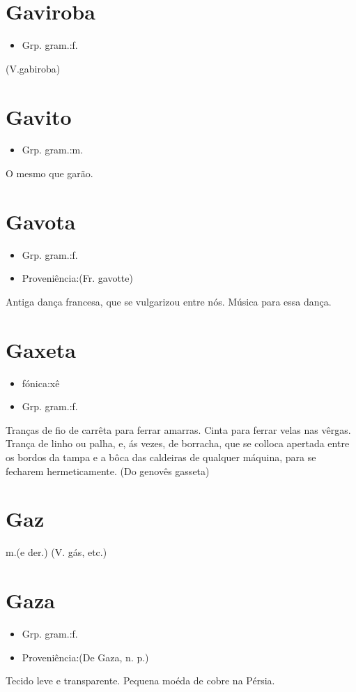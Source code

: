 \section{Gaviroba}
\begin{itemize}
\item {Grp. gram.:f.}
\end{itemize}
(V.gabiroba)
\section{Gavito}
\begin{itemize}
\item {Grp. gram.:m.}
\end{itemize}
O mesmo que \textunderscore garão\textunderscore .
\section{Gavota}
\begin{itemize}
\item {Grp. gram.:f.}
\end{itemize}
\begin{itemize}
\item {Proveniência:(Fr. \textunderscore gavotte\textunderscore )}
\end{itemize}
Antiga dança francesa, que se vulgarizou entre nós.
Música para essa dança.
\section{Gaxeta}
\begin{itemize}
\item {fónica:xê}
\end{itemize}
\begin{itemize}
\item {Grp. gram.:f.}
\end{itemize}
Tranças de fio de carrêta para ferrar amarras.
Cinta para ferrar velas nas vêrgas.
Trança de linho ou palha, e, ás vezes, de borracha, que se colloca apertada entre os bordos da tampa e a bôca das caldeiras de qualquer máquina, para se fecharem hermeticamente.
(Do genovês \textunderscore gasseta\textunderscore )
\section{Gaz}
\textunderscore m.\textunderscore  (e der.)
(V. \textunderscore gás\textunderscore , etc.)
\section{Gaza}
\begin{itemize}
\item {Grp. gram.:f.}
\end{itemize}
\begin{itemize}
\item {Proveniência:(De \textunderscore Gaza\textunderscore , n. p.)}
\end{itemize}
Tecido leve e transparente.
Pequena moéda de cobre na Pérsia.
